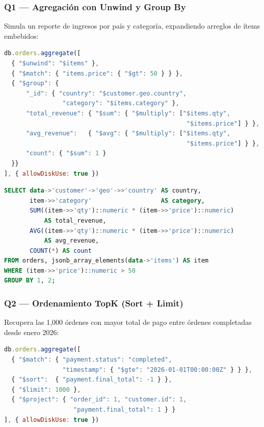 \documentclass[12pt,a4paper]{article}
\begin{document}
\subsubsection{Q1 — Agregación con Unwind y Group By}

Simula un reporte de ingresos por país y categoría, expandiendo arreglos de ítems embebidos:

\begin{lstlisting}[language=JavaScript, caption={Q1 — MongoDB: Unwind + Group}]
db.orders.aggregate([
  { "$unwind": "$items" },
  { "$match": { "items.price": { "$gt": 50 } } },
  { "$group": {
      "_id": { "country": "$customer.geo.country",
                "category": "$items.category" },
      "total_revenue": { "$sum": { "$multiply": ["$items.qty",
                                                  "$items.price"] } },
      "avg_revenue":   { "$avg": { "$multiply": ["$items.qty",
                                                  "$items.price"] } },
      "count": { "$sum": 1 }
  }}
], { allowDiskUse: true })
\end{lstlisting}

\begin{lstlisting}[language=SQL, caption={Q1 — PostgreSQL JSONB: jsonb\_array\_elements + GROUP BY}]
SELECT data->'customer'->'geo'->>'country' AS country,
       item->>'category'                   AS category,
       SUM((item->>'qty')::numeric * (item->>'price')::numeric)
           AS total_revenue,
       AVG((item->>'qty')::numeric * (item->>'price')::numeric)
           AS avg_revenue,
       COUNT(*) AS count
FROM orders, jsonb_array_elements(data->'items') AS item
WHERE (item->>'price')::numeric > 50
GROUP BY 1, 2;
\end{lstlisting}

\subsubsection{Q2 — Ordenamiento TopK (Sort + Limit)}

Recupera las 1{,}000 órdenes con mayor total de pago entre órdenes completadas desde enero 2026:

\begin{lstlisting}[language=JavaScript, caption={Q2 — MongoDB: Sort + Limit + Project}]
db.orders.aggregate([
  { "$match": { "payment.status": "completed",
                "timestamp": { "$gte": "2026-01-01T00:00:00Z" } } },
  { "$sort":  { "payment.final_total": -1 } },
  { "$limit": 1000 },
  { "$project": { "order_id": 1, "customer.id": 1,
                   "payment.final_total": 1 } }
], { allowDiskUse: true })
\end{lstlisting}
\end{document}
